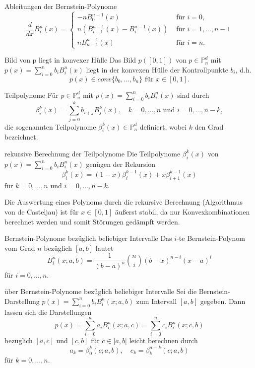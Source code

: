 \begin{flashcard}[Lemma]{Ableitungen der Bernstein-Polynome}
$$
	\frac{d}{dx}B_i^n(x) =
	\begin{cases}
		-nB_0^{n-1}(x)&\text{ für } i=0,\\
		n(B_{i-1}^{n-1}(x) - B_{i}^{n-1}(x)) &\text{ für } i=1, \ldots , n-1 \\
		nB_{n-1}^{n-1}(x) &\text{ für } i=n.
	\end{cases}
$$
\end{flashcard}

\begin{flashcard}[Satz]{Bild von p liegt in konvexer Hülle}
Das Bild $p([0,1])$ von $p \in \mathbb{P}_n^d$ mit $p(x) = \sum_{i=0}^n b_i B_i^n(x)$
liegt in der konvexen Hülle der Kontrollpunkte $b_i$, d.h.
$$
	p(x) \in conv\lbrace b_0, \ldots , b_n \rbrace \text{ für } x \in [0,1].
$$
\end{flashcard}

\begin{flashcard}[Definition]{Teilpolynome}
Für $p \in \mathbb{P}_n^d$ mit $p(x) = \sum_{i=0}^n b_i B_i^n(x)$ sind durch
$$
\beta_i^k(x) = \sum_{j=0}^k b_{i+j}B_j^k(x), \quad k=0, \ldots, n \text{ und }  i=0, \ldots, n-k,
$$
die sogenannten Teilpolynome $\beta_i^k(x) \in \mathbb{P}_n^d$ definiert, wobei $k$ den Grad bezeichnet.
\end{flashcard}

\begin{flashcard}[Satz]{rekursive Berechnung der Teilpolynome}
Die Teilpolynome $\beta_i^k(x)$ von $p(x) = \sum_{i=0}^n b_i B_i^n(x)$ genügen der Rekursion
$$
	\beta_i^k(x) = (1-x)\beta_i^{k-1}(x) + x\beta_{i+1}^{k-1}(x)
$$
für $k=0, \ldots , n$ und $i = 0, \ldots , n-k$.

Die Auswertung eines Polynoms durch die rekursive Berechnung (Algorithmus von de Casteljau)
ist für $x \in  [0,1]$ äußerst stabil, da nur Konvexkombinationen berechnet werden und somit Störungen gedämpft werden.
\end{flashcard}

\begin{flashcard}[Definition]{Bernstein-Polynome bezüglich beliebiger Intervalle}
Das $i$-te Bernstein-Polynom vom Grad $n$ bezüglich $[a,b]$ lautet
$$
	B_i^n(x; a, b) = \frac{1}{(b-a)^n}\binom{n}{i}(b-x)^{n-i}(x-a)^i
$$
für $i=0, \ldots , n$.
\end{flashcard}

\begin{flashcard}[Satz]{über Bernstein-Polynome bezüglich beliebiger Intervalle}
Sei die Bernstein-Darstellung $p(x) = \sum_{i=0}^n b_i B_i^n(x; a, b)$ zum Intervall $[a,b]$ gegeben.
Dann lassen sich die Darstellungen
$$
	p(x) = \sum_{i=0}^n a_i B_i^n(x; a, c) = \sum_{i=0}^n c_i B_i^n(x; c, b)
$$
bezüglich $[a, c]$ und $[c, b]$ für $c \in ]a, b[$ leicht berechnen durch
$$
	a_k = \beta_0^k(c; a,b), \quad c_k = \beta_k^{n-k}(c; a, b)
$$
für $k=0, \ldots ,n$.
\end{flashcard}

